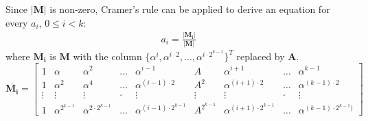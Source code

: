 Since $|\mathbf{M}|$ is non-zero, Cramer's rule can be applied to derive 
an equation for every $a_i$, $0\leq i < k$:
\begin{eqnarray}
a_i = \frac{|\mathbf{M_i}|}{|\mathbf{M}|} \label{eqn:cramerform}%
\end{eqnarray}
where $\mathbf{M_i}$ is $\mathbf{M}$ with the column $\{\alpha^i,\alpha^{i\cdot 2},\dots,\alpha^{i\cdot 2^{k-1}}\}^T$ 
replaced by $\mathbf{A}$.
\begin{equation}\label{eqn:M_i}
\mathbf{M_i} = \begin{bmatrix}
1      &   \alpha           & \alpha^2          & \dots  & \alpha^{i-1}          & A           & \alpha^{i+1}          & \dots & \alpha^{k-1} \\
1      &   \alpha^2         & \alpha^{4}       & \dots  & \alpha^{(i-1)\cdot 2}       & A^2         & \alpha^{(i+1)\cdot 2}       & \dots & \alpha^{(k-1)\cdot 2} \\
\vdots & \vdots             & \vdots            & \cdot  & \vdots                & \vdots      & \vdots                & \cdot & \vdots \\
1      &   \alpha^{2^{k-1}} & \alpha^{2\cdot 2^{k-1}} & \dots  & \alpha^{(i-1)\cdot 2^{k-1}} & A^{2^{k-1}} & \alpha^{(i+1)\cdot 2^{k-1}} & \dots & \alpha^{(k-1)\cdot 2^{k-1})}
\end{bmatrix}
\end{equation}

